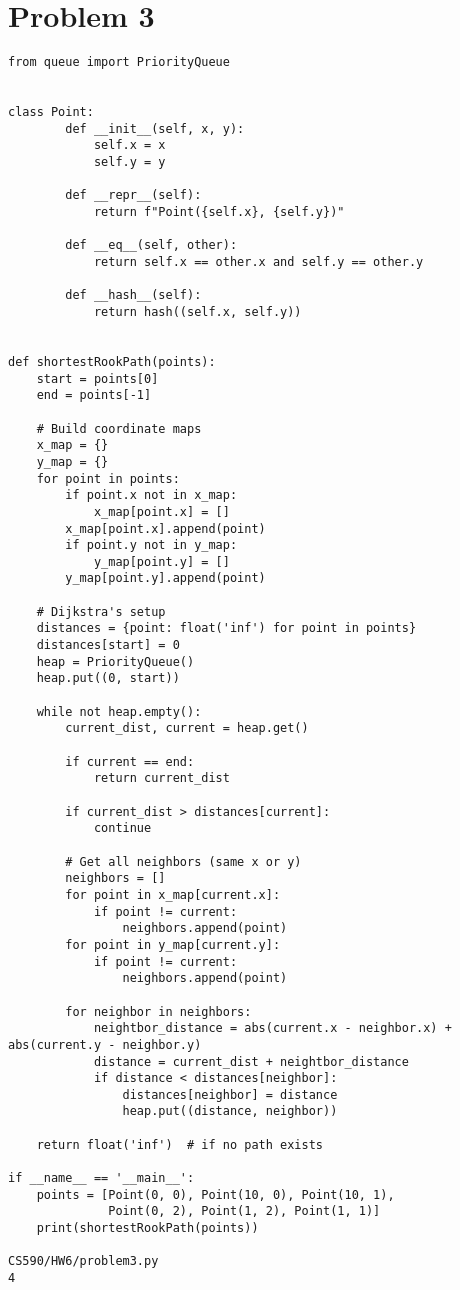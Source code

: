 \documentclass[12pt, letterpaper]{article}
\begin{document}
\section*{Problem 3}

\begin{verbatim}
from queue import PriorityQueue


class Point:
        def __init__(self, x, y):
            self.x = x
            self.y = y

        def __repr__(self):
            return f"Point({self.x}, {self.y})"

        def __eq__(self, other):
            return self.x == other.x and self.y == other.y

        def __hash__(self):
            return hash((self.x, self.y))


def shortestRookPath(points):
    start = points[0]
    end = points[-1]
    
    # Build coordinate maps
    x_map = {}
    y_map = {}
    for point in points:
        if point.x not in x_map:
            x_map[point.x] = []
        x_map[point.x].append(point)        
        if point.y not in y_map:
            y_map[point.y] = []
        y_map[point.y].append(point)
    
    # Dijkstra's setup
    distances = {point: float('inf') for point in points}
    distances[start] = 0
    heap = PriorityQueue()
    heap.put((0, start))
    
    while not heap.empty():
        current_dist, current = heap.get()
        
        if current == end:
            return current_dist
            
        if current_dist > distances[current]:
            continue
            
        # Get all neighbors (same x or y)
        neighbors = []
        for point in x_map[current.x]:
            if point != current:
                neighbors.append(point)
        for point in y_map[current.y]:
            if point != current:
                neighbors.append(point)
                
        for neighbor in neighbors:
            neightbor_distance = abs(current.x - neighbor.x) + abs(current.y - neighbor.y)
            distance = current_dist + neightbor_distance
            if distance < distances[neighbor]:
                distances[neighbor] = distance
                heap.put((distance, neighbor))
    
    return float('inf')  # if no path exists

if __name__ == '__main__':
    points = [Point(0, 0), Point(10, 0), Point(10, 1),
              Point(0, 2), Point(1, 2), Point(1, 1)]
    print(shortestRookPath(points))

CS590/HW6/problem3.py
4
\end{verbatim}
\end{document}
